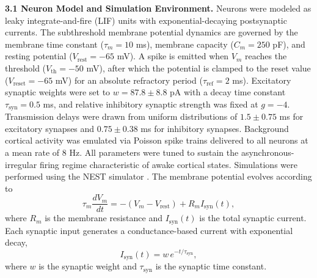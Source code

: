 \textbf{3.1 Neuron Model and Simulation Environment.} Neurons were modeled as leaky integrate-and-fire (LIF) units with exponential-decaying postsynaptic currents. The subthreshold membrane potential dynamics are governed by the membrane time constant ($\tau_m = 10$ ms), membrane capacity ($C_m = 250$ pF), and resting potential ($V_{\text{rest}} = -65$ mV). A spike is emitted when $V_m$ reaches the threshold ($V_{\text{th}} = -50$ mV), after which the potential is clamped to the reset value ($V_{\text{reset}} = -65$ mV) for an absolute refractory period ($\tau_{\text{ref}} = 2$ ms). Excitatory synaptic weights were set to $w = 87.8 \pm 8.8$ pA with a decay time constant $\tau_{\text{syn}} = 0.5$ ms, and relative inhibitory synaptic strength was fixed at $g = -4$. Transmission delays were drawn from uniform distributions of $1.5 \pm 0.75$ ms for excitatory synapses and $0.75 \pm 0.38$ ms for inhibitory synapses. Background cortical activity was emulated via Poisson spike trains delivered to all neurons at a mean rate of $8$ Hz. All parameters were tuned to sustain the asynchronous-irregular firing regime characteristic of awake cortical states. Simulations were performed using the NEST simulator \citep{Gewaltig2007}.
%
The membrane potential evolves according to
\begin{equation}
  \tau_m \frac{dV_m}{dt} = -(V_m - V_{\text{rest}}) + R_m I_{\text{syn}}(t),
\end{equation}
where $R_m$ is the membrane resistance and $I_{\text{syn}}(t)$ is the total synaptic current. Each synaptic input generates a conductance-based current with exponential decay,
\begin{equation}
  I_{\text{syn}}(t) = w \, e^{-t / \tau_{\text{syn}}},
\end{equation}
where $w$ is the synaptic weight and $\tau_{\text{syn}}$ is the synaptic time constant.

